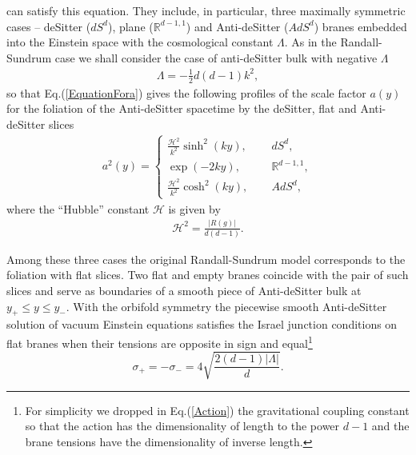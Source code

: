 \documentclass[a4paper,12pt]{article}
\newcommand{\p}{{+}}
\newcommand{\n}{{-}}
\newcommand{\ddim}{{d}}
\newcommand{\tens}{{\sigma}}
\newcommand{\R}{{\mathbb R}} %
\begin{document}
can satisfy this equation. They include, in particular, three
maximally symmetric cases -- deSitter ($dS^d$), plane
($\R^{\ddim-1,1}$) and Anti-deSitter ($AdS^{\ddim}$) branes
embedded into the Einstein space with the cosmological constant
$\Lambda$. As in the Randall-Sundrum case we shall consider the
case of anti-deSitter bulk with negative $\Lambda$
    \begin{eqnarray}
     \Lambda= -\frac12 \ddim(\ddim-1)k^2,
    \end{eqnarray}
so that Eq.(\ref{EquationFora}) gives the following profiles of
the scale factor $a(y)$ for the foliation of the Anti-deSitter
spacetime by the deSitter, flat and Anti-deSitter slices
    \begin{eqnarray}
     a^2(y)=\left\{\begin{array}{ll}
     \displaystyle{\frac{\mathcal{H}^2}{k^2}}
     \sinh^2(ky),\quad &\; dS^\ddim,\\
     \exp(-2ky), \quad &\; \R^{\ddim-1,1},\\
     \displaystyle{\frac{\mathcal{H}^2}{k^2}}
     \cosh^2(ky), \quad &\; AdS^\ddim,
     \end{array} \right.                          \label{dSRAdS}
    \end{eqnarray}
where the ``Hubble'' constant $\mathcal{H}$ is given by
    \begin{eqnarray}
     \mathcal{H}^2=\frac{\big|R(g)\big|}{\ddim(\ddim-1)}.
    \end{eqnarray}


Among these three cases the original Randall-Sundrum model
\cite{RS} corresponds to the foliation with flat slices. Two flat
and empty branes coincide with the pair of such slices and serve
as boundaries of a smooth piece of Anti-deSitter bulk at $y_+\leq
y\leq y_-$. With the orbifold symmetry the piecewise smooth
Anti-deSitter solution of vacuum Einstein equations satisfies the
Israel junction conditions on flat branes when their tensions are
opposite in sign and equal\footnote{For simplicity we dropped in
Eq.(\ref{Action}) the gravitational coupling constant so that the
action has the dimensionality of length to the power $d-1$ and the
brane tensions have the dimensionality of inverse length.}
    \begin{equation}
     \tens_\p=-\tens_\n
     =4\sqrt{\frac{2(\ddim-1)
     |\Lambda|}{\ddim}}.\label{TensionsFlat}
    \end{equation}
\end{document}

